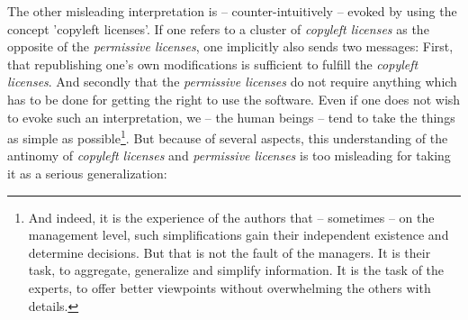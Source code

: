 The other misleading interpretation is -- counter-intuitively -- evoked by using
the concept 'copyleft licenses'. If one refers to a cluster of \emph{copyleft
licenses} as the opposite of the \emph{permissive licenses}, one implicitly also
sends two messages: First, that republishing one's own modifications
is sufficient to fulfill the \emph{copyleft licenses}. And secondly that the
\emph{permissive licenses} do not require anything which has to be done for
getting the right to use the software. Even if one does not wish to evoke such
an interpretation, we -- the human beings -- tend to take the things as simple as
possible\footnote{And indeed, it is the experience of the authors that --
sometimes -- on the management level, such simplifications gain their independent
existence and determine decisions. But that is not the fault of the managers.
It is their task, to aggregate, generalize and simplify information. It is the
task of the experts, to offer better viewpoints without overwhelming the others
with details.}. But because of several aspects, this understanding of the
antinomy of \emph{copyleft licenses} and \emph{permissive licenses} is too
misleading for taking it as a serious generalization:

